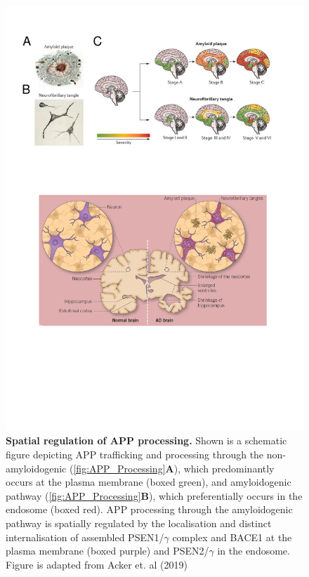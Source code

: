 \begin{figure}[!htp]
	\centering
	\includegraphics[page=6,trim={0 8cm 0cm 0cm},clip, scale = 0.7]{Figures/Introduction_Figures.pdf}
	\captionsetup{width=0.95\textwidth,singlelinecheck=off}
	\caption[Spatial regulation of APP trafficking and processing]%
	{\textbf{Spatial regulation of APP processing.} Shown is a schematic figure depicting APP trafficking and processing through the non-amyloidogenic (\cref{fig:APP_Processing}\textbf{A}), which predominantly occurs at the plasma membrane (boxed green), and amyloidogenic pathway (\cref{fig:APP_Processing}\textbf{B}), which preferentially occurs in the endosome (boxed red). APP processing through the amyloidogenic pathway is spatially regulated by the localisation and distinct internalisation of assembled PSEN1/$\gamma$ complex and BACE1 at the plasma membrane (boxed purple) and PSEN2/$\gamma$ in the endosome. Figure is adapted from Acker et. al (2019)\cite{Acker2019}  
	}
	\label{fig:APP_Trafficking}
\end{figure}

